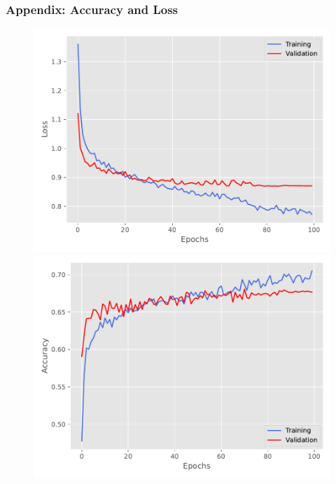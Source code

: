 \begin{frame}
    \frametitle{Appendix: Accuracy and Loss}
    \begin{figure}
        \begin{minipage}[b]{0.48\textwidth}
            \centering
            \includegraphics[width=\textwidth]{../figures/Loss.pdf}
        \end{minipage}
        \hfill
        \begin{minipage}[b]{0.48\textwidth}
            \centering
            \includegraphics[width=\textwidth]{../figures/Acc.pdf}
        \end{minipage}
    \end{figure}
\end{frame}

